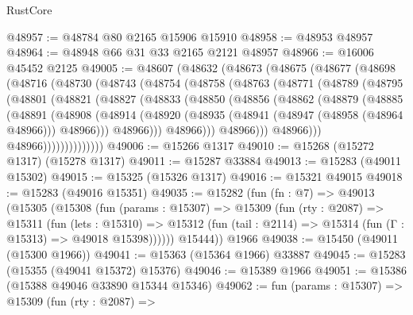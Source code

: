 \begin{lexlean}{RustCore}
\begin{coremodule}
@48957 := @48784 @80 @2165 @15906 @15910
@48958 := @48953 @48957
@48964 := @48948 @66 @31 @33 @2165 @2121 @48957
@48966 := @16006 @45452 @2125
@49005 := @48607
    (@48632
      (@48673
        (@48675
          (@48677
            (@48698
              (@48716
                (@48730
                  (@48743
                    (@48754
                      (@48758
                        (@48763
                          (@48771
                            (@48789
                              (@48795
                                (@48801
                                  (@48821
                                    (@48827
                                      (@48833
                                        (@48850
                                          (@48856
                                            (@48862
                                              (@48879
                                                (@48885
                                                  (@48891
                                                    (@48908
                                                      (@48914
                                                        (@48920
                                                          (@48935
                                                            (@48941
                                                              (@48947 (@48958 (@48964 @48966)))
                                                              @48966)))
                                                        @48966)))
                                                  @48966)))
                                            @48966)))
                                      @48966)))
                                @48966))))))))))))))
@49006 := @15266 @1317
@49010 := @15268 (@15272 @1317) (@15278 @1317)
@49011 := @15287 @33884
@49013 := @15283 (@49011 @15302)
@49015 := @15325 (@15326 @1317)
@49016 := @15321 @49015
@49018 := @15283 (@49016 @15351)
@49035 := @15282
    (fun (fn : @7) =>
    @49013
      (@15305
        (@15308
          (fun (params : @15307) =>
          @15309
            (fun (rty : @2087) =>
            @15311
              (fun (lets : @15310) =>
              @15312 (fun (tail : @2114) => @15314 (fun (Γ : @15313) => @49018 @15398))))))
        @15444))
    @1966
@49038 := @15450 (@49011 (@15300 @1966))
@49041 := @15363 (@15364 @1966) @33887
@49045 := @15283 (@15355 (@49041 @15372) @15376)
@49046 := @15389 @1966
@49051 := @15386 (@15388 @49046 @33890 @15344 @15346)
@49062 := fun (params : @15307) =>
  @15309
    (fun (rty : @2087) =>

\end{coremodule}
\end{lexlean}
